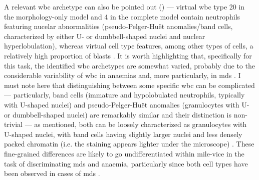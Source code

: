 \begin{figure}[!ht]
    \label{fig:rbc-disease-detection-examples}
\end{figure}

A relevant \ac{wbc} archetype can also be pointed out () --- virtual \ac{wbc} type 20 in the morphology-only model and 4 in the complete model contain neutrophils featuring nucelar abnormalities (pseudo-Pelger-Huët anomalies/band cells, characterized by either U- or dumbbell-shaped nuclei \cite{Bain2005-zg} and nuclear hyperlobulation), whereas virtual cell type features, among other types of cells, a relatively high proportion of blasts . It is worth highlighting that, specifically for this task, the identified \ac{wbc} archetypes are somewhat varied, probably due to the considerable variability of \ac{wbc} in anaemias and, more particularly, in \ac{mds} \cite{Bain2005-zg,Bain2014-oc}. I must note here that distinguishing between some specific \ac{wbc} can be complicated --- particularly, band cells (immature and hypolobulated neutrophils, typically with U-shaped nuclei) and pseudo-Pelger-Huët anomalies (granulocytes with U- or dumbbell-shaped nuclei) are remarkably similar and their distinction is non-trivial --- as mentioned, both can be loosely characterized as granulocytes with U-shaped nuclei, with band cells having slightly larger nuclei and less densely packed chromatin (i.e. the staining appears lighter under the microscope) \cite{Colella2012-so}. These fine-grained differences are likely to go undifferentiated within \ac{mile-vice} in the task of discriminating \ac{mds} and anaemia, particularly since both cell types have been observed in cases of \ac{mds} \cite{Davey1988-zn,Cunningham1995-pc}.

\begin{figure}[!ht]
    \label{fig:wbc-disease-detection-examples}
\end{figure}

